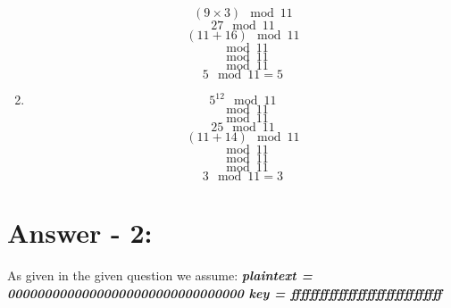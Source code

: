 \documentclass[10pt,a4paper,oneside]{article}
\begin{document}
\begin{enumerate}
\begin{equation}
(9 \times 3) \mod 11
\end{equation}
\begin{equation}
27 \mod 11
\end{equation}
\begin{equation}
(11+16) \mod 11
\end{equation}
\begin{equation}
[ (11 \mod 11)  + (16 \mod 11) ] \mod 11
\end{equation}
\begin{equation}
[ (11 + 5) \mod 11) ] \mod 11
\end{equation}
\begin{equation}
[ (11 \mod 11) + (5 \mod 11) ] \mod 11
\end{equation}
\begin{equation}
5 \mod 11 = 5
\end{equation}
\item
\begin{equation}
5^{12} \mod 11
\end{equation}
\begin{equation}
[ 5^{11} \times 5 ] \mod 11
\end{equation}
\begin{equation}
[ (5 \mod 11) \times 5 ] \mod 11
\end{equation}
\begin{equation}
25 \mod 11
\end{equation}
\begin{equation}
(11 + 14) \mod 11
\end{equation}
\begin{equation}
[ (11 \mod 11) + (14 \mod 11) ] \mod 11
\end{equation}
\begin{equation}
[ (11+3) \mod 11) ] \mod 11
\end{equation}
\begin{equation}
[( (11 \mod 11)  + (3 \mod 11) ) \mod 11 ] \mod 11
\end{equation}
\begin{equation}
3 \mod 11 = 3
\end{equation}
\end{enumerate}

\section*{Answer - 2:}

As given in the given question we assume:\newline
\textit{
\textbf{
plaintext = 00000000000000000000000000000000\newline
key = ffffffffffffffffffffffffffffffff\newline
}
}
\newline
\end{document}
